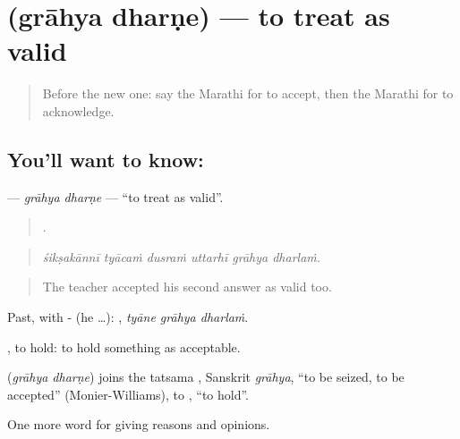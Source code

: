 \section[\texorpdfstring{\mr{ग्राह्य} \mr{धरणे} (grāhya dharṇe)}{ग्राह्य धरणे (grāhya dharṇe)}]{  (grāhya dharṇe) — to treat as valid}

\label{lesson:MR-C350-grahya-dharne}



\begin{quote}
Before the new one: say the Marathi for to accept, then the Marathi for to acknowledge.
\end{quote}

\subsection*{You'll want to know:  }
\textbf{ } — \emph{grāhya dharṇe} — \textquotedblleft{}to treat as valid\textquotedblright{}.

\begin{quote}
     .
\end{quote}

\begin{quote}
\emph{śikṣakānnī tyācaṁ dusraṁ uttarhī grāhya dharlaṁ.}
\end{quote}

\begin{quote}
The teacher accepted his second answer as valid too.
\end{quote}

Past, with - (he …):   , \emph{tyāne grāhya dharlaṁ}.

, to hold: to hold something as acceptable.

\begin{cousinweb}
\textbf{ } (\emph{grāhya dharṇe}) joins the tatsama , Sanskrit \emph{grāhya}, \textquotedblleft{}to be seized, to be accepted\textquotedblright{} (Monier-Williams), to , \textquotedblleft{}to hold\textquotedblright{}.
\end{cousinweb}

\begin{grammarlens}[title={What you've built}]
One more word for giving reasons and opinions.
\end{grammarlens}

